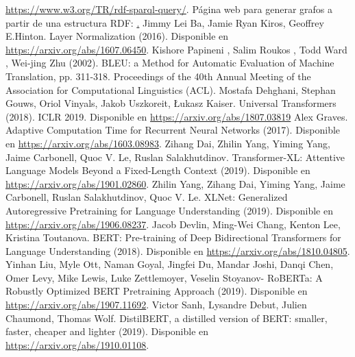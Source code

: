 \documentclass[conference]{IEEEtran}
\begin{document}
\begin{thebibliography}{00}
\href{https://arxiv.org/abs/1502.03167}{https://www.w3.org/TR/rdf-sparql-query/}. 
Página web para generar grafos a partir de una estructura RDF: \href{https://www.ldf.fi/service/rdf-grapher}.
 Jimmy Lei Ba, Jamie Ryan Kiros, Geoffrey E.Hinton. Layer Normalization (2016). Disponible en \href{https://arxiv.org/abs/1607.06450}{https://arxiv.org/abs/1607.06450}.
Kishore Papineni , Salim Roukos , Todd Ward , Wei-jing Zhu (2002). BLEU: a Method for Automatic Evaluation of Machine Translation,  pp. 311-318. Proceedings of the 40th Annual Meeting of the Association for Computational Linguistics (ACL). 
Mostafa Dehghani, Stephan Gouws, Oriol Vinyals, Jakob Uszkoreit, Łukasz Kaiser. Universal Transformers (2018). ICLR 2019. Disponible en \href{https://arxiv.org/abs/1807.03819}{https://arxiv.org/abs/1807.03819}
Alex Graves. Adaptive Computation Time for Recurrent Neural Networks (2017). Disponible en \href{https://arxiv.org/abs/1603.08983}{https://arxiv.org/abs/1603.08983}.
Zihang Dai, Zhilin Yang, Yiming Yang, Jaime Carbonell, Quoc V. Le, Ruslan Salakhutdinov. Transformer-XL: Attentive Language Models Beyond a Fixed-Length Context (2019). Disponible en \href{https://arxiv.org/abs/1901.02860}{https://arxiv.org/abs/1901.02860}. 
Zhilin Yang, Zihang Dai, Yiming Yang, Jaime Carbonell, Ruslan Salakhutdinov, Quoc V. Le. XLNet: Generalized Autoregressive Pretraining for Language Understanding (2019). Disponible en \href{https://arxiv.org/abs/1906.08237}{https://arxiv.org/abs/1906.08237}.
Jacob Devlin, Ming-Wei Chang, Kenton Lee, Kristina Toutanova. BERT: Pre-training of Deep Bidirectional Transformers for Language Understanding (2018). Disponible en \href{https://arxiv.org/abs/1810.04805}{https://arxiv.org/abs/1810.04805}.
Yinhan Liu, Myle Ott, Naman Goyal, Jingfei Du, Mandar Joshi, Danqi Chen, Omer Levy, Mike Lewis, Luke Zettlemoyer, Veselin Stoyanov- RoBERTa: A Robustly Optimized BERT Pretraining Approach (2019). Disponible en \href{https://arxiv.org/abs/1907.11692}{https://arxiv.org/abs/1907.11692}.
Victor Sanh, Lysandre Debut, Julien Chaumond, Thomas Wolf. DistilBERT, a distilled version of BERT: smaller, faster, cheaper and lighter (2019). Disponible en \href{https://arxiv.org/abs/1910.01108}{https://arxiv.org/abs/1910.01108}.

\end{thebibliography}
\end{document}
